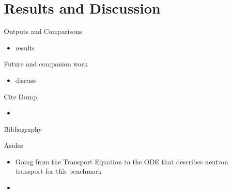 \documentclass[9pt,t]{beamer}
\begin{document}
\section{Results and Discussion}
\begin{frame}{Outputs and Comparisons}
    \begin{itemize}
        \item results
    \end{itemize}
\end{frame}

\begin{frame}{Future and companion work}
    \begin{itemize}
        \item discuss
    \end{itemize}
\end{frame}


\begin{frame}{Cite Dump}
    \begin{itemize}
        \item \cite{aya2023} \cite{brown-entropy-2006} \cite{dufek} \cite{lindsay2022moose} \cite{nekrs} \cite{novak-2023} \cite{novak2022-cardinal} \cite{openmc}
    \end{itemize}
\end{frame}

\begin{frame}[allowframebreaks]{Bibliography}
    \printbibliography
\end{frame}

\begin{frame}{Asides}
    \begin{itemize}
        \item Going from the Transport Equation to the ODE that describes neutron transport for this benchmark
        \item 
    \end{itemize}
\end{frame}
\end{document}
